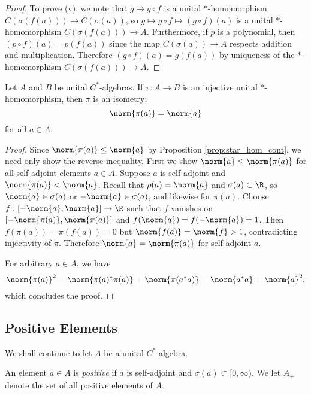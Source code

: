 \begin{proof}
To prove (v), we note that $g \mapsto g \circ f$ is a unital $*$-homomorphism $C(\sigma(f(a))) \rightarrow C(\sigma(a))$, so $g \mapsto g \circ f \mapsto (g \circ f)(a)$ is a unital $*$-homomorphism $C(\sigma(f(a))) \rightarrow A$. Furthermore, if $p$ is a polynomial, then $(p \circ f)(a) = p(f(a))$ since the map $C(\sigma(a)) \rightarrow A$ respects addition and multiplication. Therefore $(g \circ f)(a) = g(f(a))$ by uniqueness of the $*$-homomorphism $C(\sigma(f(a))) \rightarrow A$.
\end{proof}

\begin{corollary}
Let $A$ and $B$ be unital $C^*$-algebras. If $\pi:A \rightarrow B$ is an injective unital $*$-homomorphism, then $\pi$ is an isometry:
\begin{equation}
\norm{\pi(a)} = \norm{a}
\end{equation}
for all $a \in A$.
\end{corollary}

\begin{proof}
Since $\norm{\pi(a)} \leq \norm{a}$ by Proposition \ref{prop:star_hom_cont}, we need only show the reverse inequality. First we show $\norm{a} \leq \norm{\pi(a)}$ for all self-adjoint elements $a \in A$. Suppose $a$ is self-adjoint and $\norm{\pi(a)} < \norm{a}$. Recall that $\rho(a) = \norm{a}$ and $\sigma(a) \subset \R$, so $\norm{a} \in \sigma(a)$ or $-\norm{a} \in \sigma(a)$, and likewise for $\pi(a)$. Choose $f :[-\norm{a}, \norm{a}] \rightarrow \R$ such that $f$ vanishes on $[-\norm{\pi(a)}, \norm{\pi(a)}]$ and $f(\norm{a}) = f(-\norm{a}) = 1$. Then $f(\pi(a)) = \pi(f(a)) = 0$ but $\norm{f(a)} = \norm{f} > 1$, contradicting injectivity of $\pi$. Therefore $\norm{a} = \norm{\pi(a)}$ for self-adjoint $a$.

For arbitrary $a \in A$, we have
\begin{equation}
\norm{\pi(a)}^2 = \norm{\pi(a)^*\pi(a)} = \norm{\pi(a^*a)} = \norm{a^*a} = \norm{a}^2,
\end{equation}
which concludes the proof.
\end{proof}


\subsection{Positive Elements}

We shall continue to let $A$ be a unital $C^*$-algebra.

\begin{definition}
An element $a \in A$ is \emph{positive} if $a$ is self-adjoint and $\sigma(a) \subset [0,\infty)$. We let $A_+$ denote the set of all positive elements of $A$.
\end{definition}

